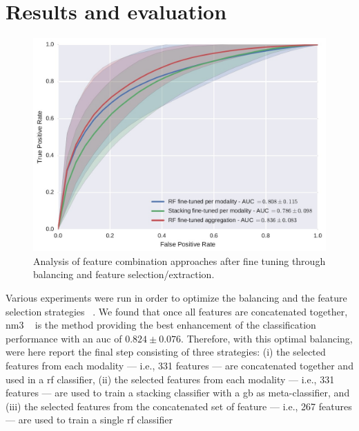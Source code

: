 \section{Results and evaluation} \label{sc:results}
\begin{figure}
\centering
 \includegraphics[width=0.9\linewidth]{Figures/test.jpg}
  \caption[Analysis of feature combination approaches after fine tuning.]{Analysis of feature combination approaches after fine tuning through balancing and feature selection/extraction.}
  \label{fig:res-Ex4}
\end{figure}

Various experiments were run in order to optimize the balancing and the feature selection strategies  ~\cite{Lemaitre2016thesis}. We found that once all features are concatenated together, \ac{nm3}  ~\cite{mani2003knn} is the method providing the best enhancement of the classification performance with an \ac{auc} of $0.824 \pm 0.076$. Therefore, with this optimal balancing, were here report the final step consisting of three strategies:
(i) the selected features from each modality --- i.e., 331 features --- are concatenated together and used in a \ac{rf} classifier,
(ii) the selected features from each modality --- i.e., 331 features --- are used to train a stacking classifier with a \ac{gb} as meta-classifier, and
(iii) the selected features from the concatenated set of feature --- i.e., 267 features --- are used to train a single \ac{rf} classifier


